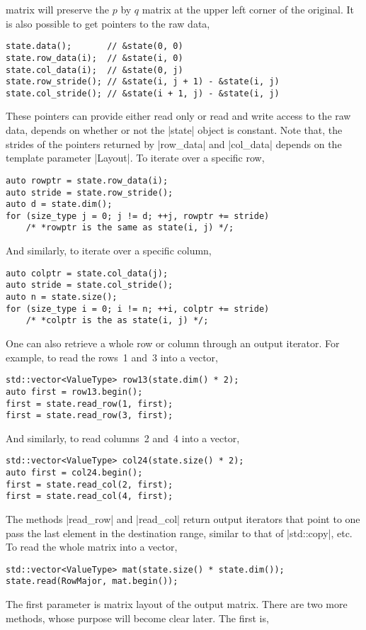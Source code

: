 matrix will preserve the $p$ by $q$ matrix at the upper left corner of the
original. It is also possible to get pointers to the raw data,
\begin{verbatim}
state.data();       // &state(0, 0)
state.row_data(i);  // &state(i, 0)
state.col_data(i);  // &state(0, j)
state.row_stride(); // &state(i, j + 1) - &state(i, j)
state.col_stride(); // &state(i + 1, j) - &state(i, j)
\end{verbatim}
These pointers can provide either read only or read and write access to the raw
data, depends on whether or not the |state| object is constant. Note that, the
strides of the pointers returned by |row_data| and |col_data| depends on the
template parameter |Layout|. To iterate over a specific row,
\begin{verbatim}
auto rowptr = state.row_data(i);
auto stride = state.row_stride();
auto d = state.dim();
for (size_type j = 0; j != d; ++j, rowptr += stride)
    /* *rowptr is the same as state(i, j) */;
\end{verbatim}
And similarly, to iterate over a specific column,
\begin{verbatim}
auto colptr = state.col_data(j);
auto stride = state.col_stride();
auto n = state.size();
for (size_type i = 0; i != n; ++i, colptr += stride)
    /* *colptr is the as state(i, j) */;
\end{verbatim}
One can also retrieve a whole row or column through an output iterator. For
example, to read the rows~1 and~3 into a vector,
\begin{verbatim}
std::vector<ValueType> row13(state.dim() * 2);
auto first = row13.begin();
first = state.read_row(1, first);
first = state.read_row(3, first);
\end{verbatim}
And similarly, to read columns~2 and~4 into a vector,
\begin{verbatim}
std::vector<ValueType> col24(state.size() * 2);
auto first = col24.begin();
first = state.read_col(2, first);
first = state.read_col(4, first);
\end{verbatim}
The methods |read_row| and |read_col| return output iterators that point to one
pass the last element in the destination range, similar to that of |std::copy|,
etc. To read the whole matrix into a vector,
\begin{verbatim}
std::vector<ValueType> mat(state.size() * state.dim());
state.read(RowMajor, mat.begin());
\end{verbatim}
The first parameter is matrix layout of the output matrix. There are two more
methods, whose purpose will become clear later. The first is,

